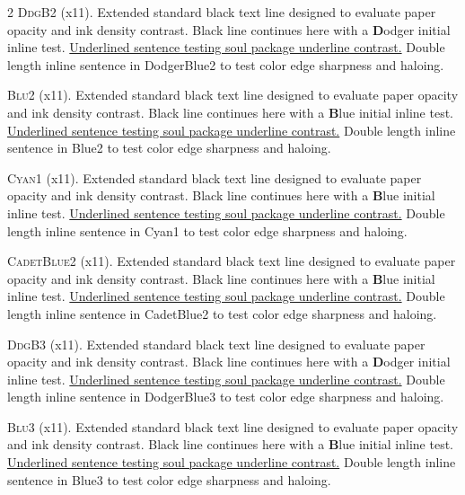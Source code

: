 \begin{multicols}{2}
\lettrine[lines=2]{\textcolor{DodgerBlue2}{D}}{dgB2} (x11). Extended standard black text line designed to evaluate paper opacity and ink density contrast. Black line continues here with a \textbf{\textcolor{DodgerBlue2}{D}}odger initial inline test. \ul{Underlined sentence testing soul package underline contrast.} \textcolor{DodgerBlue2}{Double length inline sentence in DodgerBlue2 to test color edge sharpness and haloing.}


\lettrine[lines=2]{\textcolor{Blue2}{B}}{lu2} (x11). Extended standard black text line designed to evaluate paper opacity and ink density contrast. Black line continues here with a \textbf{\textcolor{Blue2}{B}}lue initial inline test. \ul{Underlined sentence testing soul package underline contrast.} \textcolor{Blue2}{Double length inline sentence in Blue2 to test color edge sharpness and haloing.}


\lettrine[lines=2]{\textcolor{Cyan1}{C}}{yan1} (x11). Extended standard black text line designed to evaluate paper opacity and ink density contrast. Black line continues here with a \textbf{\textcolor{Cyan1}{B}}lue initial inline test. \ul{Underlined sentence testing soul package underline contrast.} \textcolor{Cyan1}{Double length inline sentence in Cyan1 to test color edge sharpness and haloing.}


\lettrine[lines=2]{\textcolor{CadetBlue2}{C}}{adetBlue2} (x11). Extended standard black text line designed to evaluate paper opacity and ink density contrast. Black line continues here with a \textbf{\textcolor{CadetBlue2}{B}}lue initial inline test. \ul{Underlined sentence testing soul package underline contrast.} \textcolor{CadetBlue2}{Double length inline sentence in CadetBlue2 to test color edge sharpness and haloing.}


\lettrine[lines=2]{\textcolor{DodgerBlue3}{D}}{dgB3} (x11). Extended standard black text line designed to evaluate paper opacity and ink density contrast. Black line continues here with a \textbf{\textcolor{DodgerBlue3}{D}}odger initial inline test. \ul{Underlined sentence testing soul package underline contrast.} \textcolor{DodgerBlue3}{Double length inline sentence in DodgerBlue3 to test color edge sharpness and haloing.}


\lettrine[lines=2]{\textcolor{Blue3}{B}}{lu3} (x11). Extended standard black text line designed to evaluate paper opacity and ink density contrast. Black line continues here with a \textbf{\textcolor{Blue3}{B}}lue initial inline test. \ul{Underlined sentence testing soul package underline contrast.} \textcolor{Blue3}{Double length inline sentence in Blue3 to test color edge sharpness and haloing.}



\end{multicols}
